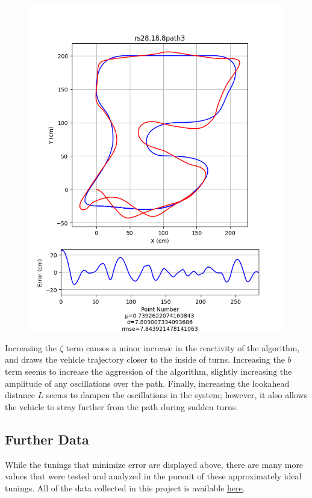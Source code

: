 \documentclass[mla7]{mla}
\begin{document}
\begin{paper}
\begin{figure}[H]
\endminipage\\
\includegraphics[width=\linewidth]{pathData/rspath3}
\endminipage
\end{figure}

Increasing the $\zeta$ term causes a minor increase in the reactivity of the algorithm, and draws the vehicle trajectory closer to the inside of turns. Increasing the $b$ term seems to increase the aggression of the algorithm, slightly increasing the amplitude of any oscillations over the path. Finally, increasing the lookahead distance $L$ seems to dampen the oscillations in the system; however, it also allows the vehicle to stray further from the path during sudden turns.

\subsection{Further Data}

While the tunings that minimize error are displayed above, there are many more values that were tested and analyzed in the pursuit of these approximately ideal tunings. All of the data collected in this project is available \href{https://github.com/SpencerJ21/pathtracking/tree/develop/scripts/analysis}{\underline{here}}.


\end{paper}
\end{document}
